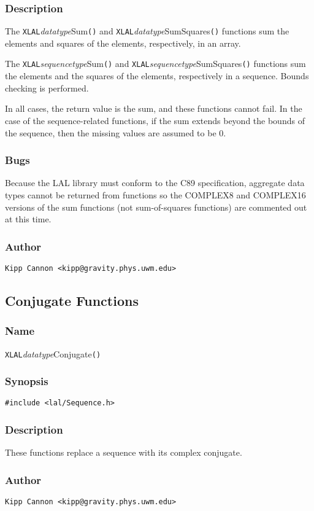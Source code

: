 \subsubsection{Description}

The \texttt{XLAL}\textit{datatype}Sum\texttt{()} and
\texttt{XLAL}\textit{datatype}SumSquares\texttt{()} functions sum the
elements and squares of the elements, respectively, in an array.

The \texttt{XLAL}\textit{sequencetype}Sum\texttt{()} and
\texttt{XLAL}\textit{sequencetype}SumSquares\texttt{()} functions sum the
elements and the squares of the elements, respectively in a sequence.
Bounds checking is performed.

In all cases, the return value is the sum, and these functions cannot fail.
In the case of the sequence-related functions, if the sum extends beyond
the bounds of the sequence, then the missing values are assumed to be 0.

\subsubsection{Bugs}

Because the LAL library must conform to the C89 specification, aggregate
data types cannot be returned from functions so the COMPLEX8 and COMPLEX16
versions of the sum functions (not sum-of-squares functions) are commented
out at this time.

\subsubsection{Author}

\verb|Kipp Cannon <kipp@gravity.phys.uwm.edu>|


\subsection{Conjugate Functions}

\subsubsection{Name}

\texttt{XLAL}\textit{datatype}Conjugate\texttt{()}

\subsubsection{Synopsis}

\begin{verbatim}
#include <lal/Sequence.h>
\end{verbatim}


\subsubsection{Description}

These functions replace a sequence with its complex conjugate.

\subsubsection{Author}

\verb|Kipp Cannon <kipp@gravity.phys.uwm.edu>|
